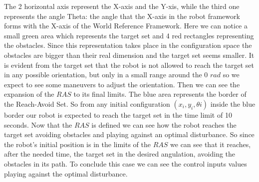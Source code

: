 The 2 horizontal axis represent the X-axis and the Y-xis, while the third one represents the angle Theta: the angle that the X-axis in the robot framework forms with the X-axis of the World Reference Framework.  
Here we can notice a small green area which represents the target set and 4 red
rectangles representing the obstacles. Since this representation takes place in the configuration space the obstacles are bigger than their real dimension and the target set seems smaller.
It is evident from the target set that the robot is not allowed to reach the target set in any possible orientation, but only in a small range around the 0 $rad$ so we expect to see some maneuvers to adjust the orientation.  
Then we can see the expansion of the $RAS$ to its final limits.
The blue area represents the border of the Reach-Avoid Set. So from any initial configuration $(x_{i},y_{i},\theta{i})$ inside the blue border our robot is expected to reach the target set in the time limit of 10 seconds. 
Now that the $RAS$ is defined we can see how the robot reaches the target set avoiding obstacles and playing against an optimal disturbance.
So since the robot's initial position is in the limits of the $RAS$ we can see that it reaches, after the needed time, the target set in the desired angulation, avoiding the obstacles in its path. To conclude this case we can see the control inputs values playing against the optimal disturbance.
